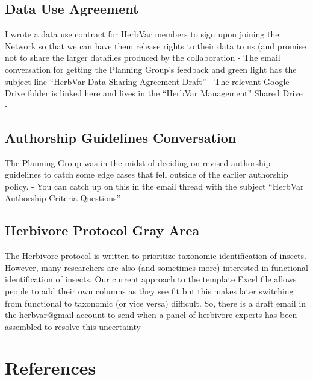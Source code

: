 \documentclass[
  letterpaper,
  DIV=11,
  numbers=noendperiod]{scrreprt}
\begin{document}
\section{Data Use Agreement}\label{data-use-agreement}

I wrote a data use contract for HerbVar members to sign upon joining the
Network so that we can have them release rights to their data to us (and
promise not to share the larger datafiles produced by the collaboration
- The email conversation for getting the Planning Group's feedback and
green light has the subject line ``HerbVar Data Sharing Agreement
Draft'' - The relevant Google Drive folder is linked here and lives in
the ``HerbVar Management'' Shared Drive -

\section{Authorship Guidelines
Conversation}\label{authorship-guidelines-conversation}

The Planning Group was in the midst of deciding on revised authorship
guidelines to catch some edge cases that fell outside of the earlier
authorship policy. - You can catch up on this in the email thread with
the subject ``HerbVar Authorship Criteria Questions''

\section{Herbivore Protocol Gray
Area}\label{herbivore-protocol-gray-area}

The Herbivore protocol is written to prioritize taxonomic identification
of insects. However, many researchers are also (and sometimes more)
interested in functional identification of insects. Our current approach
to the template Excel file allows people to add their own columns as
they see fit but this makes later switching from functional to taxonomic
(or vice versa) difficult. So, there is a draft email in the
herbvar@gmail account to send when a panel of herbivore experts has been
assembled to resolve this uncertainty


\chapter*{References}\label{references}

\end{document}
